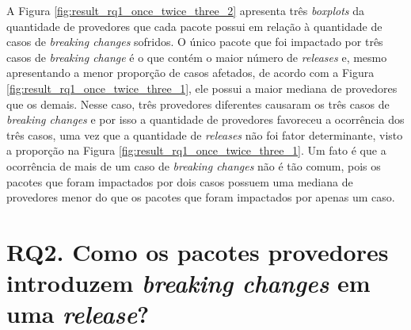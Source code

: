 A Figura \ref{fig:result_rq1_once_twice_three_2} apresenta três \textit{boxplots} da quantidade de provedores que cada pacote possui em relação à quantidade de casos de \textit{breaking changes} sofridos. O único pacote que foi impactado por três casos de \textit{breaking change} é o que contém o maior número de \textit{releases} e, mesmo apresentando a menor proporção de casos afetados, de acordo com a Figura \ref{fig:result_rq1_once_twice_three_1}, ele possui a maior mediana de provedores que os demais. Nesse caso, três provedores diferentes causaram os três casos de \textit{breaking changes} e por isso a quantidade de provedores favoreceu a ocorrência dos três casos, uma vez que a quantidade de \textit{releases} não foi fator determinante, visto a proporção na Figura \ref{fig:result_rq1_once_twice_three_1}.  Um fato é que a ocorrência de mais de um caso de \textit{breaking changes} não é tão comum, pois os pacotes que foram impactados por dois casos possuem uma mediana de provedores menor do que os pacotes que foram impactados por apenas um caso.


\section{RQ2. Como os pacotes provedores introduzem \textit{breaking changes} em uma \textit{release}?}
\label{sec:qp2:results}


